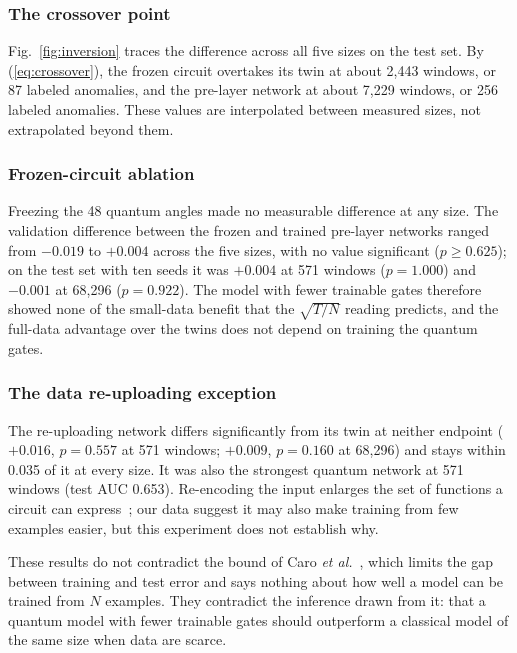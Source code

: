 \documentclass[journal]{IEEEtran}
\begin{document}
\subsubsection{The crossover point}
Fig.~\ref{fig:inversion} traces the difference across all five sizes on the
test set. By (\ref{eq:crossover}), the frozen circuit overtakes its twin at
about 2,443 windows, or 87 labeled anomalies, and the pre-layer network at about
7,229 windows, or 256 labeled anomalies. These values are interpolated between
measured sizes, not extrapolated beyond them.

\subsubsection{Frozen-circuit ablation}
Freezing the 48 quantum angles made no measurable difference at any size. The
validation difference between the frozen and trained pre-layer networks ranged
from $-0.019$ to $+0.004$ across the five sizes, with no value significant
($p\ge 0.625$); on the test set with ten seeds it was $+0.004$ at 571 windows
($p=1.000$) and $-0.001$ at 68,296 ($p=0.922$). The model with fewer trainable
gates therefore showed none of the small-data benefit that the $\sqrt{T/N}$
reading predicts, and the full-data advantage over the twins does not depend on
training the quantum gates.

\subsubsection{The data re-uploading exception}
The re-uploading network differs significantly from its twin at neither
endpoint ($+0.016$, $p=0.557$ at 571 windows; $+0.009$, $p=0.160$ at 68,296)
and stays within 0.035 of it at every size. It was also the strongest quantum
network at 571 windows (test AUC 0.653). Re-encoding the input enlarges the set
of functions a circuit can express~\cite{schuld2021encoding}; our data suggest
it may also make training from few examples easier, but this experiment does not
establish why.

These results do not contradict the bound of Caro
\textit{et al.}~\cite{caro2022generalization}, which limits the gap between
training and test error and says nothing about how well a model can be trained
from $N$ examples. They contradict the inference drawn from it: that a quantum
model with fewer trainable gates should outperform a classical model of the same
size when data are scarce.


\end{document}

